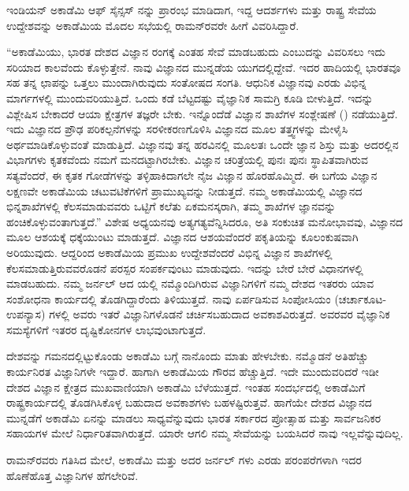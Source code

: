 ಇಂಡಿಯನ್ ಅಕಾಡೆಮಿ ಆಫ್ ಸೈನ್ಸಸ್ ನನ್ನು ಪ್ರಾರಂಭ ಮಾಡಿದಾಗ, ಇದ್ದ ಆದರ್ಶಗಳು ಮತ್ತು ರಾಷ್ಟ್ರ ಸೇವೆಯ ಉದ್ದೇಶವನ್ನು ಅಕಾಡೆಮಿಯ ಮೊದಲ ಸಭೆಯಲ್ಲಿ ರಾಮನ್‍ರವರೇ ಹೀಗೆ ವಿವರಿಸಿದ್ದಾರೆ.

“ಅಕಾಡೆಮಿಯು, ಭಾರತ ದೇಶದ ವಿಜ್ಞಾನ ರಂಗಕ್ಕೆ ಎಂತಹ ಸೇವೆ ಮಾಡಬಹುದು ಎಂಬುದನ್ನು ವಿವರಿಸಲು ಇದು ಸರಿಯಾದ ಕಾಲವೆಂದು ಕೊಳ್ಳುತ್ತೇನೆ. ನಾವು ವಿಜ್ಞಾನದ ಮುನ್ನಡೆಯ ಯುಗದಲ್ಲಿದ್ದೇವೆ. ಇದರ ಹಾದಿಯಲ್ಲಿ ಭಾರತವೂ ಸಹ ತನ್ನ ಛಾಪನ್ನು ಒತ್ತಲು ಮುಂದಾಗಿರುವುದು ಸಂತೋಷದ ಸಂಗತಿ. ಆಧುನಿಕ ವಿಜ್ಞಾನವು ಎರಡು ವಿಭಿನ್ನ ಮಾರ್ಗಗಳಲ್ಲಿ ಮುಂದುವರಿಯುತ್ತಿದೆ. ಒಂದು ಕಡೆ ಬೆಟ್ಟದಷ್ಟು ವೈಜ್ಞಾನಿಕ ಸಾಮಗ್ರಿ ಕೂಡಿ ಬೀಳುತ್ತಿದೆ. ಇದನ್ನು ವಿಶ್ಲೇಷಿಸ ಬೇಕಾದರೆ ಆಯಾ ಕ್ಷೇತ್ರಗಳ ತಜ್ಞರೇ ಬೇಕು. ಇನ್ನೊಂದೆಡೆ ವಿಜ್ಞಾನ ಶಾಖೆಗಳ ಸಂಶ್ಲೇಷಣೆ () ನಡೆಯುತ್ತಿದೆ. ಇದು ವಿಜ್ಞಾನದ ಪ್ರೌಢ ಪರಿಕಲ್ಪನೆಗಳನ್ನು ಸರಳೀಕರಣಗೊಳಿಸಿ ವಿಜ್ಞಾನದ ಮೂಲ ತತ್ತ್ವಗಳನ್ನು ಮೇಳೈಸಿ ಅರ್ಥಮಾಡಿಕೊಳ್ಳುವಂತೆ ಮಾಡುತ್ತಿದೆ. ವಿಜ್ಞಾನವು ತನ್ನ ಹರವಿನಲ್ಲಿ ಮೂಲತಃ ಒಂದೇ ಜ್ಞಾನ ಶಿಸ್ತು ಮತ್ತು ಅದರಲ್ಲಿನ ವಿಭಾಗಗಳು ಕೃತಕವೆಂದು ನಮಗೆ ಮನದಟ್ಟಾಗಿರಬೇಕು. ವಿಜ್ಞಾನ ಚರಿತ್ರೆಯಲ್ಲಿ ಪುನಃ ಪುನಃ ಸ್ಥಾಪಿತವಾಗಿರುವ ಸತ್ಯವೆಂದರೆ, ಈ ಕೃತಕ ಗೋಡೆಗಳನ್ನು ತಳ್ಳಿಹಾಕಿದಾಗಲೇ ನೈಜ ವಿಜ್ಞಾನ ಹೊರಹೊಮ್ಮಿದೆ. ಈ ಬಗೆಯ ವಿಜ್ಞಾನ ಲಕ್ಷಣವೇ ಅಕಾಡೆಮಿಯ ಚಟುವಟಿಕೆಗಳಿಗೆ ಪ್ರಾಮುಖ್ಯವನ್ನು ನೀಡುತ್ತದೆ. ನಮ್ಮ ಅಕಾಡೆಮಿಯಲ್ಲಿ ವಿಜ್ಞಾನದ ಭಿನ್ನಶಾಖೆಗಳಲ್ಲಿ ಕೆಲಸಮಾಡುವವರು ಒಟ್ಟಿಗೆ ಕಲೆತು ಏಕಮನಸ್ಕರಾಗಿ, ತಮ್ಮ ಶಾಖೆಗಳ ಜ್ಞಾನವನ್ನು ಹಂಚಿಕೊಳ್ಳುವಂತಾಗುತ್ತದೆ.” ವಿಶೇಷ ಅಧ್ಯಯನವು ಅತ್ಯಗತ್ಯವೆನ್ನಿಸಿದರೂ, ಅತಿ ಸಂಕುಚಿತ ಮನೋಭಾವವು, ವಿಜ್ಞಾನದ ಮೂಲ ಆಶಯಕ್ಕೆ ಧಕ್ಕೆಯುಂಟು ಮಾಡುತ್ತದೆ. ವಿಜ್ಞಾನದ ಆಶಯವೆಂದರೆ ಪಕೃತಿಯನ್ನು ಕೂಲಂಕುಷವಾಗಿ ಅರಿಯುವುದು. ಆದ್ದರಿಂದ ಅಕಾಡೆಮಿಯ ಪ್ರಮುಖ ಉದ್ದೇಶವೆಂದರೆ ವಿಭಿನ್ನ ವಿಜ್ಞಾನ ಶಾಖೆಗಳಲ್ಲಿ ಕೆಲಸಮಾಡುತ್ತಿರುವವರೊಡನೆ ಪರಸ್ಪರ ಸಂಪರ್ಕವುಂಟು ಮಾಡುವುದು. ಇದನ್ನು ಬೇರೆ ಬೇರೆ ವಿಧಾನಗಳಲ್ಲಿ ಮಾಡಬಹುದು. ನಮ್ಮ ಜರ್ನಲ್ ಆದ \textit{} ಯಲ್ಲಿ ನಮ್ಮೊಂದಿಗಿರುವ ವಿಜ್ಞಾನಿಗಳಿಗೆ ನಮ್ಮ ದೇಶದ ಇತರರು ಯಾವ ಸಂಶೋಧನಾ ಕಾರ್ಯದಲ್ಲಿ ತೊಡಗಿದ್ದಾರೆಂದು ತಿಳಿಯುತ್ತದೆ. ನಾವು ಏರ್ಪಡಿಸುವ ಸಿಂಪೋಸಿಯಂ (ಚರ್ಚಾಕೂಟ-ಉಪನ್ಯಾಸ) ಗಳಲ್ಲಿ ಅವರು ಇತರೆ ವಿಜ್ಞಾನಿಗಳೊಡನೆ ಚರ್ಚಿಸಬಹುದಾದ ಅವಕಾಶವಿರುತ್ತದೆ. ಅವರವರ ವೈಜ್ಞಾನಿಕ ಸಮಸ್ಯೆಗಳಿಗೆ ಇತರರ ದೃಷ್ಟಿಕೋನಗಳ ಲಾಭವುಂಟಾಗುತ್ತದೆ.

ದೇಶವನ್ನು ಗಮನದಲ್ಲಿಟ್ಟುಕೊಂಡು ಅಕಾಡೆಮಿ ಬಗ್ಗೆ ನಾನೊಂದು ಮಾತು ಹೇಳಬೇಕು. ನಮ್ಮೊಡನೆ ಅತಿಹೆಚ್ಚು ಕಾರ್ಯನಿರತ ವಿಜ್ಞಾನಿಗಳೇ ಇದ್ದಾರೆ. ಹಾಗಾಗಿ ಅಕಾಡೆಮಿಯ ಗೌರವ ಹೆಚ್ಚುತ್ತಿದೆ. ಇದೇ ಮುಂದುವರಿದರೆ ಇಡೀ ದೇಶದ ವಿಜ್ಞಾನ ಕ್ಷೇತ್ರದ ಮುಖವಾಣಿಯಾಗಿ ಅಕಾಡೆಮಿ ಬೆಳೆಯುತ್ತದೆ. ಇಂತಹ ಸಂದರ್ಭದಲ್ಲಿ ಅಕಾಡೆಮಿಗೆ ರಾಷ್ಟ್ರಕಾರ್ಯದಲ್ಲಿ ತೊಡಗಿಸಿಕೊಳ್ಳ ಬಹುದಾದ ಅವಕಾಶಗಳು ಬಹಳಷ್ಟಿರುತ್ತವೆ. ಹಾಗೆಯೇ ದೇಶದ ವಿಜ್ಞಾನದ ಮುನ್ನಡೆಗೆ ಅಕಾಡೆಮಿ ಏನನ್ನು ಮಾಡಲು ಸಾಧ್ಯವೆನ್ನುವುದು ಭಾರತ ಸರ್ಕಾರದ ಪ್ರೋತ್ಸಾಹ ಮತ್ತು ಸಾರ್ವಜನಿಕರ ಸಹಾಯಗಳ ಮೇಲೆ ನಿರ್ಧಾರಿತವಾಗಿರುತ್ತದೆ. ಯಾರೇ ಆಗಲಿ ನಮ್ಮ ಸೇವೆಯನ್ನು ಬಯಸಿದರೆ ನಾವು ಇಲ್ಲವೆನ್ನುವುದಿಲ್ಲ.

ರಾಮನ್‍ರವರು ಗತಿಸಿದ ಮೇಲೆ, ಅಕಾಡೆಮಿ ಮತ್ತು ಅದರ ಜರ್ನಲ್  ಗಳು ಎರಡು ಪರಂಪರೆಗಳಾಗಿ ಇದರ ಹೊಣೆಹೊತ್ತ ವಿಜ್ಞಾನಿಗಳ ಹೆಗಲೇರಿವೆ.

